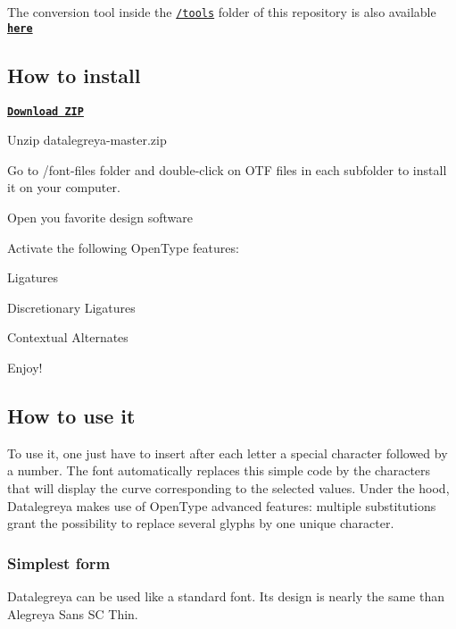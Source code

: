 The conversion tool inside the \href{https://github.com/figs-lab/datalegreya/tree/master/tools}{\tt {\ttfamily /tools}} folder of this repository is also available \href{http://www.figs-lab.com/content/datalegreya/convert.html}{\tt {\bfseries here}}

\subsection*{How to install}


\begin{DoxyEnumerate}
\item \href{https://github.com/figs-lab/datalegreya/archive/master.zip}{\tt {\bfseries Download Z\+IP}}
\item Unzip {\ttfamily datalegreya-\/master.\+zip}
\item Go to {\ttfamily /font-\/files} folder and double-\/click on O\+TF files in each subfolder to install it on your computer.
\item Open you favorite design software
\item Activate the following Open\+Type features\+:
\begin{DoxyItemize}
\item Ligatures
\item Discretionary Ligatures
\item Contextual Alternates
\end{DoxyItemize}
\item Enjoy!
\end{DoxyEnumerate}

\subsection*{How to use it}

To use it, one just have to insert after each letter a special character followed by a number. The font automatically replaces this simple code by the characters that will display the curve corresponding to the selected values. Under the hood, Datalegreya makes use of Open\+Type advanced features\+: multiple substitutions grant the possibility to replace several glyphs by one unique character.

\subsubsection*{Simplest form}

Datalegreya can be used like a standard font. Its design is nearly the same than Alegreya Sans SC Thin.


